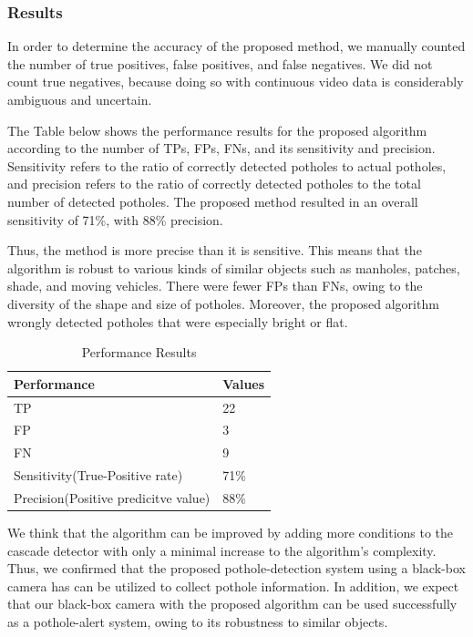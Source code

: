 \documentclass[12pt]{report}
\begin{document}
\subsubsection{Results}
In order to determine the accuracy of the proposed method, we manually counted the number of true positives, false positives, and false negatives. We did not count true negatives, because doing so with continuous video data is considerably ambiguous and uncertain.

The Table below shows the performance results for the proposed algorithm according to the number of TPs, FPs, FNs, and its sensitivity and precision. Sensitivity refers to the ratio of correctly detected potholes to actual potholes, and precision refers to the ratio of correctly detected potholes to the total number of detected potholes. The proposed method resulted in an overall sensitivity of 71\%, with 88\% precision\cite{Jo}. 

Thus, the method is more precise than it is sensitive. This means that the algorithm is robust to various kinds of similar objects such as manholes, patches, shade, and moving vehicles. There were fewer FPs than FNs, owing to the diversity of the shape and size of potholes. Moreover, the proposed algorithm wrongly detected potholes that were especially bright or flat.
\begin{table}[H]
\caption{Performance Results \cite{Jo}} %
\centering %
    \begin{tabular}{| l | l |}
	 \hline\hline
    Performance& Values \\ \hline
   TP&22 \\ \hline
    FP&3 \\ \hline
    FN &9 \\ \hline
    Sensitivity(True-Positive rate) &  71\% \\ \hline
   Precision(Positive predicitve value) &  88\% \\ \hline
      		
\end{tabular}
\end{table}
We think that the algorithm can be improved by adding more conditions to the cascade detector with only a minimal increase to the algorithm’s complexity. Thus, we confirmed that the proposed pothole-detection system using a black-box camera has can be utilized to collect pothole information. In addition, we expect that our black-box camera with the proposed algorithm can be used successfully as a pothole-alert system, owing to its robustness to similar objects\cite{Jo}.
\end{document}
